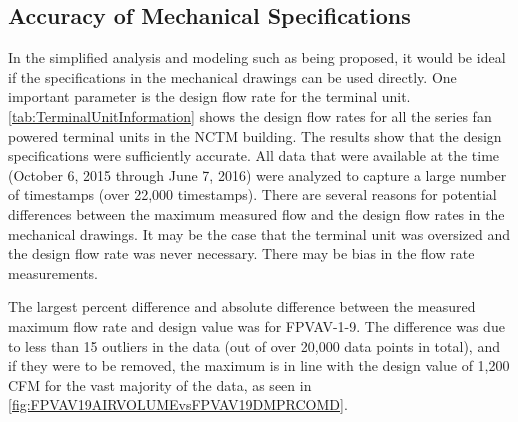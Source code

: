 \subsection{Accuracy of Mechanical Specifications}

In the simplified analysis and modeling such as being proposed, it would be
ideal if the specifications in the mechanical drawings can be used
directly.  One important parameter is the design flow rate for the
terminal unit.  \tableref{} \ref{tab:TerminalUnitInformation} shows the
design flow rates for all the series fan powered terminal units in the
NCTM building.  The results show that the design specifications were
sufficiently accurate.  All data that were available at the time
(October 6, 2015 through June 7, 2016) were analyzed to capture a large
number of timestamps (over 22,000 timestamps).  There are several
reasons for potential differences between the maximum measured flow and
the design flow rates in the mechanical drawings.  It may be the case
that the terminal unit was oversized and the design flow rate was never
necessary. There may be bias in the flow rate measurements.  

The largest percent difference and absolute difference between the
measured maximum flow rate and design value was for FPVAV-1-9. The
difference was due to less than 15 outliers in the data (out of over
20,000 data points in total), and if they were to be removed, the
maximum is in line with the design value of 1,200 CFM for the vast
majority of the data, as seen in \figref{}
\ref{fig:FPVAV19AIRVOLUMEvsFPVAV19DMPRCOMD}. 

